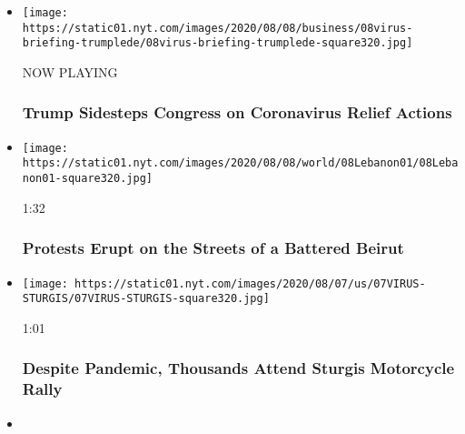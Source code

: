 \begin{itemize}
\item
  \texttt{[image: https://static01.nyt.com/images/2020/08/08/business/08virus-briefing-trumplede/08virus-briefing-trumplede-square320.jpg]}

  NOW PLAYING

  \hypertarget{trump-sidesteps-congress-on-coronavirus-relief-actions-2}{%
  \subsubsection{Trump Sidesteps Congress on Coronavirus Relief
  Actions}\label{trump-sidesteps-congress-on-coronavirus-relief-actions-2}}
\item
  \href{https://www.nytimes.com/video/world/100000007279742/beirut-explosion-lebanon-protests.html?action=click\&module=video-series-bar\&region=header\&pgtype=Article\&playlistId=video/latest-video}{}

  \texttt{[image: https://static01.nyt.com/images/2020/08/08/world/08Lebanon01/08Lebanon01-square320.jpg]}

  1:32

  \hypertarget{protests-erupt-on-the-streets-of-a-battered-beirut}{%
  \subsubsection{Protests Erupt on the Streets of a Battered
  Beirut}\label{protests-erupt-on-the-streets-of-a-battered-beirut}}
\item
  \href{https://www.nytimes.com/video/us/100000007279713/sturgis-motorcycle-rally-coronavirus.html?action=click\&module=video-series-bar\&region=header\&pgtype=Article\&playlistId=video/latest-video}{}

  \texttt{[image: https://static01.nyt.com/images/2020/08/07/us/07VIRUS-STURGIS/07VIRUS-STURGIS-square320.jpg]}

  1:01

  \hypertarget{despite-pandemic-thousands-attend-sturgis-motorcycle-rally}{%
  \subsubsection{Despite Pandemic, Thousands Attend Sturgis Motorcycle
  Rally}\label{despite-pandemic-thousands-attend-sturgis-motorcycle-rally}}
\item
  \href{https://www.nytimes.com/video/us/politics/100000007279339/trump-says-he-will-act-on-his-own-if-congress-doesnt-agree-on-relief.html?action=click\&module=video-series-bar\&region=header\&pgtype=Article\&playlistId=video/latest-video}{}


\end{itemize}
